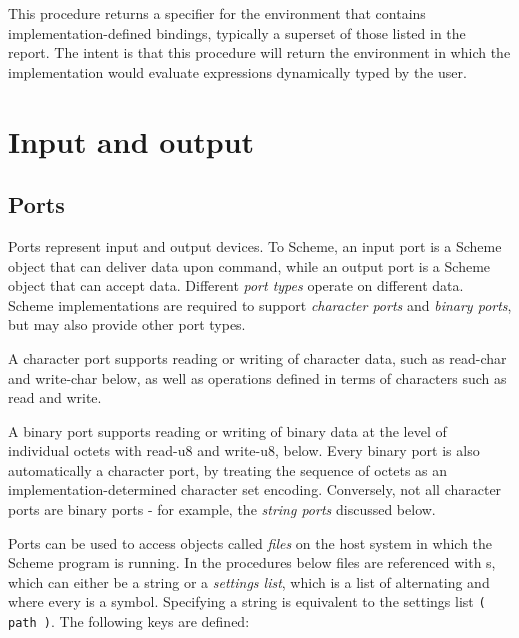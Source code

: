 \begin{entry}{%
}

This procedure returns a specifier for the environment that
contains imple\-men\-ta\-tion-defined bindings, typically a superset of
those listed in the report.  The intent is that this procedure
will return the environment in which the implementation would evaluate
expressions dynamically typed by the user.

\end{entry}

\section{Input and output}

\subsection{Ports}
\label{portsection}

Ports represent input and output devices.  To Scheme, an input port is
a Scheme object that can deliver data upon command, while an output
port is a Scheme object that can accept data.
Different {\em port types} operate on different data.  Scheme
imple\-men\-ta\-tions are required to support {\em character ports}
and {\em binary ports}, but may also provide other port types.

A character port supports reading or writing of character data, such
as {\cf read-char} and {\cf write-char} below, as well as operations
defined in terms of characters such as {\cf read} and {\cf write}.

A binary port supports reading or writing of binary data at the level
of individual octets with {\cf read-u8} and {\cf write-u8}, below.
Every binary port is also automatically a character port, by treating
the sequence of octets as an implementation-determined character set
encoding.  Conversely, not all character ports are binary ports - for
example, the {\em string ports} discussed below.

Ports can be used to access objects called {\em files} on the host
system in which the Scheme program is running.  In the procedures
below files are referenced with s, which can either
be a string or a {\em settings list}, which is a list of alternating
 and  where every  is a symbol.
Specifying a string is equivalent to the settings list \texttt{({\cf
    path} )}. The following keys are defined:

